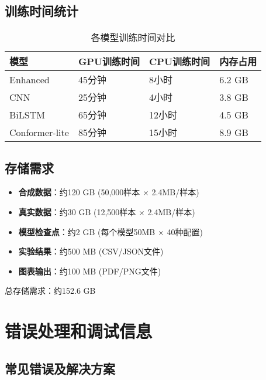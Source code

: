 \subsection{训练时间统计}
\label{app:training_time}

\begin{table}[h]
\centering
\caption{各模型训练时间对比}
\label{tab:training_time_comparison}
\begin{tabular}{llll}
\toprule
\textbf{模型} & \textbf{GPU训练时间} & \textbf{CPU训练时间} & \textbf{内存占用} \\
\midrule
Enhanced & 45分钟 & 8小时 & 6.2 GB \\
CNN & 25分钟 & 4小时 & 3.8 GB \\
BiLSTM & 65分钟 & 12小时 & 4.5 GB \\
Conformer-lite & 85分钟 & 15小时 & 8.9 GB \\
\bottomrule
\end{tabular}
\end{table}

\subsection{存储需求}
\label{app:storage_requirements}

\begin{itemize}
\item \textbf{合成数据}：约120 GB (50,000样本 × 2.4MB/样本)
\item \textbf{真实数据}：约30 GB (12,500样本 × 2.4MB/样本)  
\item \textbf{模型检查点}：约2 GB (每个模型50MB × 40种配置)
\item \textbf{实验结果}：约500 MB (CSV/JSON文件)
\item \textbf{图表输出}：约100 MB (PDF/PNG文件)
\end{itemize}

总存储需求：约152.6 GB

\section{错误处理和调试信息}
\label{app:error_handling}

\subsection{常见错误及解决方案}
\label{app:common_errors}

